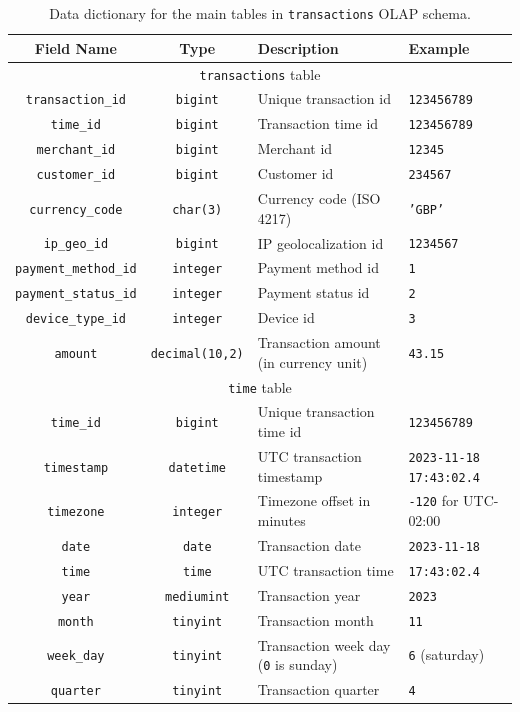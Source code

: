 \documentclass[11pt,a4paper,computermodern]{article}
\newcommand{\code}{\texttt}
\begin{document}
\begin{table}[ht]
	\centering
	\begin{threeparttable}
		\caption{Data dictionary for the main tables in \code{transactions} OLAP schema.}
		\label{table:OLAP_main}
		\begin{tabularx}{0.99\textwidth}{c c >{\centering\arraybackslash}X >{\centering\arraybackslash}X}
			\toprule
			Field Name & Type & Description & Example  \\
			\midrule
			\multicolumn{4}{c}{\code{transactions} table}\\
			\code{transaction\_id} & \code{bigint} & Unique transaction id & \code{123456789} \\
			\code{time\_id} & \code{bigint} & Transaction time id & \code{123456789} \\
			\code{merchant\_id} & \code{bigint} & Merchant id & \code{12345} \\
			\code{customer\_id} & \code{bigint} & Customer id & \code{234567} \\
			\code{currency\_code} & \code{char(3)} & Currency code (ISO 4217) & \code{'GBP'} \\
			\code{ip\_geo\_id} & \code{bigint} & IP geolocalization id & \code{1234567} \\
			\code{payment\_method\_id} & \code{integer} & Payment method id & \code{1} \\
			\code{payment\_status\_id} & \code{integer} & Payment status id & \code{2} \\
			\code{device\_type\_id} & \code{integer} & Device id & \code{3} \\
			\code{amount} & \code{decimal(10,2)} & Transaction amount (in currency unit) & \code{43.15} \\
			
			\midrule
			\multicolumn{4}{c}{\code{time} table}\\
			\code{time\_id} & \code{bigint} & Unique transaction time id & \code{123456789} \\
			\code{timestamp} & \code{datetime} & UTC transaction timestamp & \code{2023-11-18 17:43:02.4} \\
			\code{timezone} & \code{integer} & Timezone offset in minutes & \code{-120} for UTC-02:00 \\
			\code{date} & \code{date} & Transaction date & \code{2023-11-18} \\
			\code{time} & \code{time} & UTC transaction time & \code{17:43:02.4} \\
			\code{year} & \code{mediumint} & Transaction year & \code{2023} \\
			\code{month} & \code{tinyint} & Transaction month & \code{11} \\
			\code{week\_day} & \code{tinyint} & Transaction week day (\code{0} is sunday) & \code{6} (saturday) \\
			\code{quarter} & \code{tinyint} & Transaction quarter & \code{4} \\
			

\end{tabularx}
\end{threeparttable}
\end{table}
\end{document}
